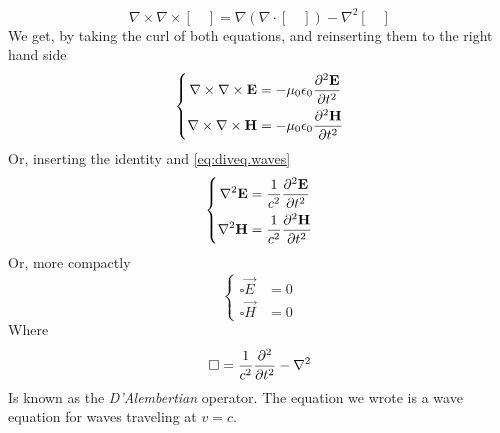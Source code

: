 \documentclass[../electromagnetism.tex]{subfiles}
\begin{document}
\begin{equation*}
	\nabla\times\nabla\times[\quad]=\nabla\left(\nabla\cdot[\quad]\right)-\nabla^2[\quad]
\end{equation*}
We get, by taking the curl of both equations, and reinserting them to the right hand side
\begin{equation}
\left\{	\begin{aligned}
		\nabla\times\nabla\times\mathbf{E}&=-\mu_0\epsilon_0\pdv[2]{\mathbf{E}}{t}\\
		\nabla\times\nabla\times\mathbf{H}&=-\mu_0\epsilon_0\pdv[2]{\mathbf{H}}{t}
	\end{aligned}\right.
	\label{eq:nablanabla.waves}
\end{equation}
Or, inserting the identity and \eqref{eq:diveq.waves}
\begin{equation}
	\left\{\begin{aligned}
			\nabla^2\mathbf{E}&=\frac{1}{c^2}\pdv[2]{\mathbf{E}}{t}\\
			\nabla^2\mathbf{H}&=\frac{1}{c^2}\pdv[2]{\mathbf{H}}{t}
	\end{aligned}\right.
	\label{eq:waveeq.waves}
\end{equation}
Or, more compactly
\begin{equation}
	\left\{ \begin{aligned}
			\square\vec{E}&=0\\
			\square\vec{H}&=0
	\end{aligned}\right.
	\label{eq:square.waves}
\end{equation}
Where
\begin{equation}
	\square=\frac{1}{c^2}\pdv[2]{t}-\nabla^2
	\label{eq:dalambertian.waves}
\end{equation}
Is known as the \textit{D'Alembertian} operator. The equation we wrote is a wave equation for waves traveling at $v=c$.
\end{document}
